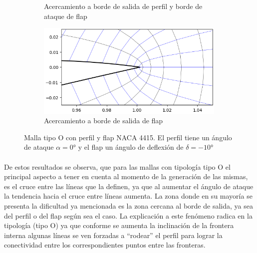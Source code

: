 \documentclass[letterpaper, openright, 12pt]{book}
\begin{document}
\begin{figure}[htbp!]
\begin{subfigure}[t]{0.45\textwidth}
            \caption{Acercamiento a borde de salida de perfil y borde de
                ataque de flap}
            \label{fig:naca4415_flap_-10_airfoil}
        \end{subfigure}
        \begin{subfigure}[c]{0.45\textwidth}
            \includegraphics[keepaspectratio,
                width=0.99\textwidth]{./img/naca4415_flap_-10_flap}
            \caption{Acercamiento a borde de salida de flap}
            \label{fig:naca4415_flap_-10_flap}
        \end{subfigure}
        \caption[Malla tipo O con perfil y flap NACA 4415 a
            $-10\si{\degree}$]{Malla tipo O con perfil y flap NACA 4415. El
            perfil tiene un ángulo de ataque $\alpha = 0\si{\degree}$ y el flap
            un ángulo de deflexión de $\delta = -10\si{\degree}$}
        \label{fig:naca4415_flap_-10}
    \end{figure}

    \paragraph*{}
    De estos resultados se observa, que para las mallas con tipología tipo O
    el principal aspecto a tener en cuenta al momento de la generación de las
    mismas, es el cruce entre las líneas que la definen, ya que al aumentar el
    ángulo de ataque la tendencia hacia el cruce entre líneas aumenta. La zona
    donde en su mayoría se presenta la dificultad ya mencionada es la zona
    cercana al borde de salida, ya sea del perfil o del flap según sea el caso.
    La explicación a este fenómeno radica en la tipología (tipo O) ya que
    conforme se aumenta la inclinación de la frontera interna algunas líneas
    se ven forzadas a ``rodear'' el perfil para lograr la conectividad entre
    los correspondientes puntos entre las fronteras.
\end{document}
